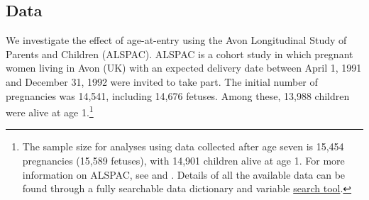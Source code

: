 \documentclass[12pt,a4paper]{article}
\begin{document}
\begin{bibunit}
\subsection{Data}
We investigate the effect of age-at-entry using the Avon Longitudinal Study of Parents and Children (ALSPAC). ALSPAC is a cohort study in which pregnant women living in Avon (UK) with an expected delivery date between April 1, 1991 and December 31, 1992 were invited to take part. The initial number of pregnancies was 14,541, including 14,676 fetuses. Among these, 13,988 children were alive at age 1.\footnote{The sample size for analyses using data collected after age seven is 15,454 pregnancies (15,589 fetuses), with 14,901 children alive at age 1. For more information on ALSPAC, see \cite{Boyd2013} and \cite{Fraser2013}. Details of all the available data can be found through a fully searchable data dictionary and variable \href{http://www.bristol.ac.uk/alspac/researchers/our-data/}{search tool}.} 


\end{bibunit}
\end{document}
